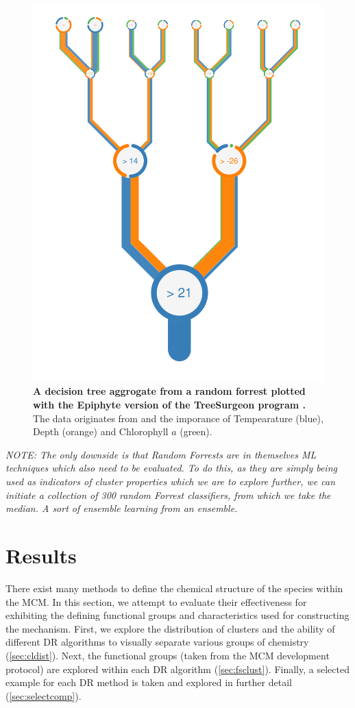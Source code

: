 \begin{figure}[H]
     \centering
         \includegraphics[width=.55\textwidth]{4fig/Oi_prj_features_of_RFR(TEMP+DEPTH+ChlrA)_for_depth_5_white.pdf}
        \caption{\textbf{A decision tree aggrogate from a random forrest plotted with the Epiphyte version of the TreeSurgeon program \citep{forrester}.} The data originates from \cite{iodene} and the imporance of Tempearature (blue), Depth (orange) and Chlorophyll $a$ (green).}
        \label{fig:iodenetree}
\end{figure}


% 

\textit{NOTE: The only downside is that Random Forrests are in themselves ML techniques which also need to be evaluated. To do this, as they are simply being used as indicators of cluster properties which we are to explore further, we can initiate a collection of 300 random Forrest classifiers, from which we take the median. A sort of ensemble learning from an ensemble. }


\section{Results}\label{sec:drres}
% 
There exist many methods to define the chemical structure of the species within the MCM. In this section, we attempt to evaluate their effectiveness for exhibiting the defining functional groups and characteristics used for constructing the mechanism. First, we explore the distribution of clusters and the ability of different DR algorithms to visually separate various groups of chemistry (\autoref{sec:cldist}). Next, the functional groups (taken from the MCM development protocol) are explored within each DR algorithm (\autoref{sec:fsclust}). Finally, a selected example for each DR method is taken and explored in further detail (\autoref{sec:selectcomp}).

